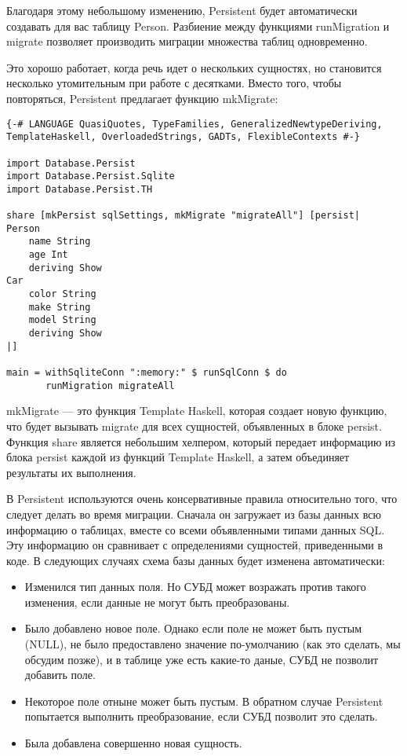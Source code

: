 Благодаря этому небольшому изменению, Persistent будет автоматически создавать для вас таблицу Person. Разбиение между функциями runMigration и migrate позволяет производить миграции множества таблиц одновременно.

Это хорошо работает, когда речь идет о нескольких сущностях, но становится несколько утомительным при работе с десятками. Вместо того, чтобы повторяться, Persistent предлагает функцию mkMigrate:

\begin{lstlisting}
{-# LANGUAGE QuasiQuotes, TypeFamilies, GeneralizedNewtypeDeriving, TemplateHaskell, OverloadedStrings, GADTs, FlexibleContexts #-}

import Database.Persist
import Database.Persist.Sqlite
import Database.Persist.TH

share [mkPersist sqlSettings, mkMigrate "migrateAll"] [persist|
Person
    name String
    age Int
    deriving Show
Car
    color String
    make String
    model String
    deriving Show
|]

main = withSqliteConn ":memory:" $ runSqlConn $ do
       runMigration migrateAll
\end{lstlisting}%

mkMigrate --- это функция Template Haskell, которая создает новую функцию, что будет вызывать migrate для всех сущностей, объявленных в блоке persist. Функция share является небольшим хелпером, который передает информацию из блока persist каждой из функций Template Haskell, а затем объединяет результаты их выполнения.

В Persistent используются очень консервативные правила относительно того, что следует делать во время миграции. Сначала он загружает из базы данных всю информацию о таблицах, вместе со всеми объявленными типами данных SQL. Эту информацию он сравнивает с определениями сущностей, приведенными в коде. В следующих случаях схема базы данных будет изменена автоматически:

\begin{itemize}
	\item Изменился тип данных поля. Но СУБД может возражать против такого изменения, если данные не могут быть преобразованы.
	\item Было добавлено новое поле. Однако если поле не может быть пустым (NULL), не было предоставлено значение по-умолчанию (как это сделать, мы обсудим позже), и в таблице уже есть какие-то даные, СУБД не позволит добавить поле.
	\item Некоторое поле отныне может быть пустым. В обратном случае Persistent попытается выполнить преобразование, если СУБД позволит это сделать.
	\item Была добавлена совершенно новая сущность.
\end{itemize}

